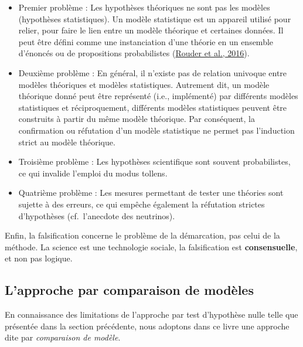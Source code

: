 \documentclass[
  a4paper,11pt,twoside,onecolumn,openright,final,oldfontcommands]{memoir}
\theoremstyle{definition}
\theoremstyle{definition}
\theoremstyle{definition}
\theoremstyle{definition}
\theoremstyle{remark}
\begin{document}
\begin{itemize}
\item
  Premier problème : Les hypothèses théoriques ne sont pas les modèles (hypothèses statistiques). Un modèle statistique est un appareil utilisé pour relier, pour faire le lien entre un modèle théorique et certaines données. Il peut être défini comme une instanciation d'une théorie en un ensemble d'énoncés ou de propositions probabilistes (\protect\hyperlink{ref-rouder_interplay_2016}{Rouder et al., 2016}).
\item
  Deuxième problème : En général, il n'existe pas de relation univoque entre modèles théoriques et modèles statistiques. Autrement dit, un modèle théorique donné peut être représenté (i.e., implémenté) par différents modèles statistiques et réciproquement, différents modèles statistiques peuvent être construits à partir du même modèle théorique. Par conséquent, la confirmation ou réfutation d'un modèle statistique ne permet pas l'induction strict au modèle théorique.
\item
  Troisième problème : Les hypothèses scientifique sont souvent probabilistes, ce qui invalide l'emploi du modus tollens.
\item
  Quatrième problème : Les mesures permettant de tester une théories sont sujette à des erreurs, ce qui empêche également la réfutation strictes d'hypothèses (cf.~l'anecdote des neutrinos).
\end{itemize}

Enfin, la falsification concerne le problème de la démarcation, pas celui de la méthode. La science est une technologie sociale, la falsification est \textbf{consensuelle}, et non pas logique.

\hypertarget{lapproche-par-comparaison-de-moduxe8les}{%
\subsection{L'approche par comparaison de modèles}\label{lapproche-par-comparaison-de-moduxe8les}}

En connaissance des limitations de l'approche par test d'hypothèse nulle telle que présentée dans la section précédente, nous adoptons dans ce livre une approche dite par \emph{comparaison de modèle}.
\end{document}
